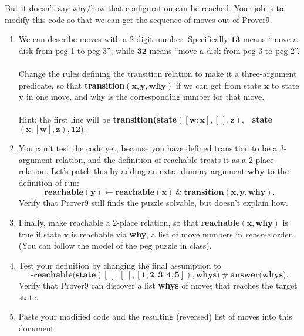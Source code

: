 \documentclass[12pt,letterpaper,boxed,cm]{hmcpset}
\newcommand{\tf}[1]{\textbf{#1}}
\newcommand{\mf}[1]{\mathbf{#1}}
\begin{document}
\begin{problem}[3. cont.]
    But it doesn’t say why/how that configuration can be reached. Your job is to modify this code so that we can get the sequence of moves out of Prover9.
    \begin{enumerate}[label=\Alph*.]
        \item We can describe moves with a 2-digit number. Specifically $\mf{13}$ means ``move a disk from peg 1 to peg 3'', while $\mf{32}$ means ``move a disk from peg 3 to peg 2''.\\\\
        Change the rules defining the transition relation to make it a three-argument predicate, so that \tf{transition}$\mf{(x,y,\tf{why})}$ if we can get from state $\mf{x}$ to state $\mf{y}$ in one move, and why is the corresponding number for that move.\\\\
        Hint:  the first line will be \tf{transition(state}$\mf{([w:x],[~],z)}$,~~\tf{state}$\mf{(x,[w],z), 12)}.$
        \item You can’t test the code yet, because you have defined transition to be a 3-argument relation, and the definition of reachable treats it as a 2-place relation. Let’s patch this by adding an extra dummy argument $\mf{why}$ to the definition of run:
        \[
            \tf{reachable}\mf{(y)} \leftarrow \tf{reachable}\mf{(x)}~\&~\tf{transition}\mf{(x,y,\tf{why})}.
        \]
        Verify that Prover9 still finds the puzzle solvable, but doesn’t explain how.
        \item Finally, make reachable a 2-place relation, so that \tf{reachable}$\mf{(x,\tf{why})}$ is true if state $\mf{x}$ is reachable via \tf{why}, a list of move numbers in \emph{reverse} order. (You can follow the model of the peg puzzle in class).
        \item Test your definition by changing the final assumption to
        \[
            \textbf{-reachable(state}\mf{([~],[~],[1,2,3,4,5])}, \tf{whys})~\#~\tf{answer(whys)}.
        \]
        Verify that Prover9 can discover a list \textbf{whys} of moves that reaches the target state. 
        \item Paste your modified code and the resulting (reversed) list of moves into this document. 
    \end{enumerate}
\end{problem}

\begin{solution}
    \vfill
\end{solution}
\newpage
\end{document}
